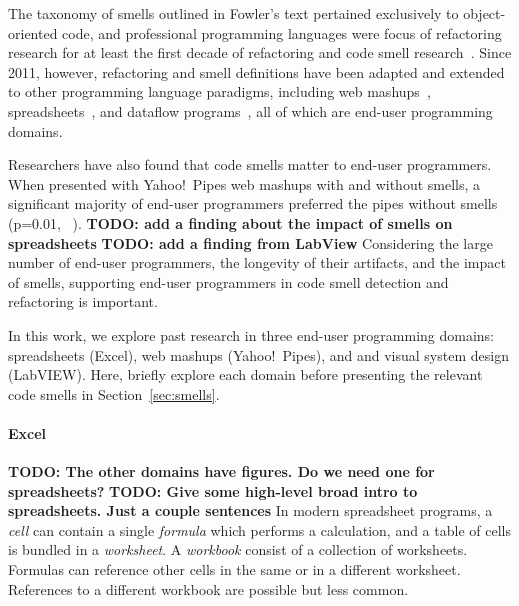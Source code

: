 \documentclass[10pt,conference,compsocconf]{IEEEtran}
\newcommand{\todo}[1]{\textbf{TODO: #1}}
\begin{document}
The taxonomy of smells outlined in Fowler's text pertained exclusively to object-oriented code, and professional programming languages were focus of refactoring research for at least the first decade of refactoring and code smell research~\cite{Mens:2004:SSR:972215.972286}.  Since 2011, however, refactoring and smell definitions have been adapted and extended to other 
programming language paradigms, including web mashups~\cite{Stolee2011, StoleeTSE2013}, spreadsheets~\cite{Hermans2011, Hermans2012inter, hermans2014bumblebee}, and dataflow programs~\cite{chambers2013smell}, all of which are  end-user programming domains. 

Researchers have also found that code smells matter to end-user programmers. When presented with Yahoo!\ Pipes web mashups with and without smells, a significant majority of end-user programmers preferred the pipes without smells (p=0.01, ~\cite{StoleeTSE2013}). \todo{add a finding about the impact of smells on spreadsheets} \todo{add a  finding from LabView}
Considering the large number of end-user programmers, the longevity of their artifacts, and the impact of smells, supporting end-user programmers in code smell detection and refactoring is important. 

In this work, we explore past research in three end-user programming domains: spreadsheets (Excel), web mashups (Yahoo!\ Pipes), and and visual system design (LabVIEW). Here, briefly explore each domain  before presenting the relevant code smells in  Section~\ref{sec:smells}.

\paragraph{Excel}
\todo{The other domains have figures. Do we need one for spreadsheets?}
\todo{Give some high-level broad intro to spreadsheets. Just a couple sentences}
In modern spreadsheet programs, a \textit{cell} can contain a single \textit{formula} which performs a calculation, and a table of cells is bundled in a \textit{worksheet}.
A \textit{workbook} consist of a collection of worksheets.
Formulas can reference other cells in the same or in a different worksheet.
References to a different workbook are possible but less common.
\end{document}
